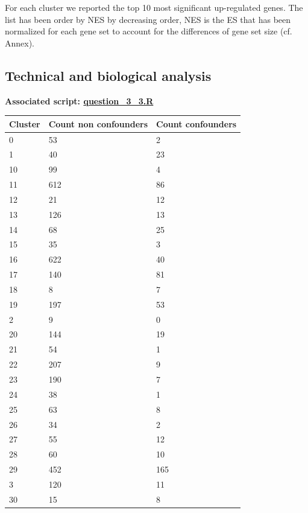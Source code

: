 \documentclass[a4paper, 11pt]{article}
\begin{document}
\begin{multicols}{2}
For each cluster we reported the top  10 most significant up-regulated genes. The list has been order by NES by decreasing order, NES is the ES that has been normalized for each gene set to account for the differences of gene set size (cf. Annex).

\subsection{Technical and biological analysis}
\begin{scriptsize}	
	\textbf{Associated script: \href{https://github.com/leopoldguyot/BINF-F401-Project/blob/main/question_3_3.R}{question\_3\_3.R}
	}
\end{scriptsize}

\begin{table}[H]
	\begin{tabularx}{\textwidth}{|X|X|X|}
	\hline
	Cluster & Count non confounders & Count confounders \\ \hline
	0 & 53 & 2 \\ \hline
	1 & 40 & 23 \\ \hline
	10 & 99 & 4 \\ \hline
	11 & 612 & 86 \\ \hline
	12 & 21 & 12 \\ \hline
	13 & 126 & 13 \\ \hline
	14 & 68 & 25 \\ \hline
	15 & 35 & 3 \\ \hline
	16 & 622 & 40 \\ \hline
	17 & 140 & 81 \\ \hline
	18 & 8 & 7 \\ \hline
	19 & 197 & 53 \\ \hline
	2 & 9 & 0 \\ \hline
	20 & 144 & 19 \\ \hline
	21 & 54 & 1 \\ \hline
	22 & 207 & 9 \\ \hline
	23 & 190 & 7 \\ \hline
	24 & 38 & 1 \\ \hline
	25 & 63 & 8 \\ \hline
	26 & 34 & 2 \\ \hline
	27 & 55 & 12 \\ \hline
	28 & 60 & 10 \\ \hline
	29 & 452 & 165 \\ \hline
	3 & 120 & 11 \\ \hline
	30 & 15 & 8 \\ \hline

\end{tabularx}
\end{table}
\end{multicols}
\end{document}
